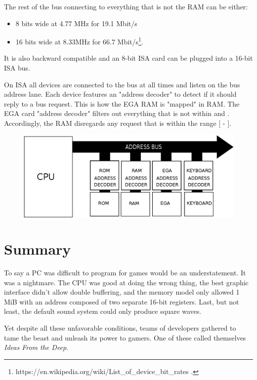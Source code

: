 \documentclass[book.tex]{subfiles}
\begin{document}
\par
The rest of the bus connecting to everything that is not the RAM can be either:
\begin{itemize}
\item 8 bits wide at 4.77 MHz  for 19.1 Mbit/s
\item 16 bits wide at 8.33MHz for 66.7 Mbit/s\footnote{https://en.wikipedia.org/wiki/List\_of\_device\_bit\_rates .}.
\end{itemize}
It is also backward compatible and an 8-bit ISA card can be plugged into a 16-bit ISA bus.\\
\par
\vspace{10pt}
 On ISA all devices are connected to the bus at all times and listen on the bus address lane. Each device features an "address decoder" to detect if it should reply to a bus request. This is how the EGA RAM is "mapped" in RAM. The EGA card "address decoder"  filters out everything that is not within  and . Accordingly, the RAM disregards any request that is within the range [ - ].\\
\par
 \begin{figure}[H]
\centering
\includegraphics[width=\textwidth]{imgs/drawings/isa.eps}
\end{figure}







\section{Summary}
To say a PC was difficult to program for games would be an understatement. It was a nightmare. The CPU was good at doing the wrong thing, the best graphic interface didn't allow double buffering, and the memory model only allowed 1 MiB with an address composed of two separate 16-bit registers. Last, but not least, the default sound system could only produce square waves.\\
\par
Yet despite all these unfavorable conditions, teams of developers gathered to tame the beast and unleash its power to gamers. One of these called themselves \textit{Ideas From the Deep}.
\end{document}

